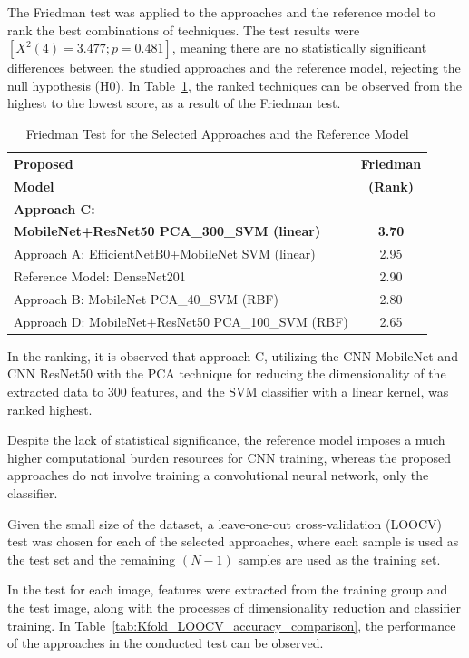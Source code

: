 \documentclass[preprint,12pt]{elsarticle}
\begin{document}
The Friedman test was applied to the approaches and the reference model to rank the best combinations of techniques. The test results were $[X^2(4)=3.477; p=0.481]$, meaning there are no statistically significant differences between the studied approaches and the reference model, rejecting the null hypothesis (H0). In Table~\ref{tab:Approaches_friedman_ranking}, the ranked techniques can be observed from the highest to the lowest score, as a result of the Friedman test.

\begin{table}[h!]
	\centering
	\caption{Friedman Test for the Selected Approaches and the Reference Model}
	\label{tab:Approaches_friedman_ranking}
	\begin{tabular}{|l|c|}
		\hline
		\textbf{Proposed} & \textbf{Friedman} \\
		\textbf{Model} & \textbf{(Rank)} \\
		\hline
		\textbf{Approach C:} &  \\
		\textbf{MobileNet+ResNet50 PCA\_300\_SVM (linear)} & \textbf{3.70} \\
		Approach A: EfficientNetB0+MobileNet SVM (linear) & 2.95 \\
		Reference Model: DenseNet201 & 2.90 \\
		Approach B: MobileNet PCA\_40\_SVM (RBF) & 2.80 \\
		Approach D: MobileNet+ResNet50 PCA\_100\_SVM (RBF) & 2.65 \\
		\hline
	\end{tabular}
\end{table}

In the ranking, it is observed that approach C, utilizing the CNN MobileNet and CNN ResNet50 with the PCA technique for reducing the dimensionality of the extracted data to 300 features, and the SVM classifier with a linear kernel, was ranked highest. 

Despite the lack of statistical significance, the reference model imposes a much higher computational burden resources for CNN training, whereas the proposed approaches do not involve training a convolutional neural network, only the classifier.

Given the small size of the dataset, a leave-one-out cross-validation (LOOCV) test was chosen for each of the selected approaches, where each sample is used as the test set and the remaining $(N-1)$ samples are used as the training set.

In the test for each image, features were extracted from the training group and the test image, along with the processes of dimensionality reduction and classifier training. In Table~\ref{tab:Kfold_LOOCV_accuracy_comparison}, the performance of the approaches in the conducted test can be observed.
\end{document}
